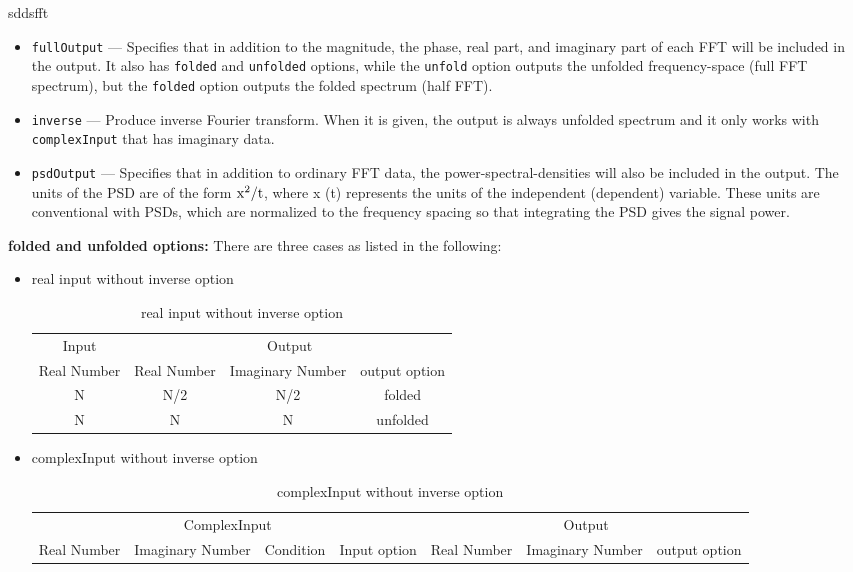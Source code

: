 \begin{sddsprog}{sddsfft}
\begin{itemize}
      \item \verb|fullOutput| --- Specifies that in addition to the magnitude, the phase, real part, and imaginary part of each FFT will be included in the output. It also has \verb|folded| and \verb|unfolded| options, while the \verb|unfold| option outputs the unfolded frequency-space (full FFT spectrum), but the \verb|folded| option outputs the folded spectrum (half FFT).
      \item \verb|inverse| --- Produce inverse Fourier transform. When it is given, the output is always unfolded spectrum and it only works with \verb|complexInput| that has imaginary data.
      \item \verb|psdOutput| --- Specifies that in addition to ordinary FFT data, the power-spectral-densities will also be included in the output. The units of the PSD are of the form ${\rm x^2/t}$, where x (t) represents the units of the independent (dependent) variable. These units are conventional with PSDs, which are normalized to the frequency spacing so that integrating the PSD gives the signal power.
    \end{itemize}
  \item \textbf{folded and unfolded options:} There are three cases as listed in the following:
    \begin{itemize}
      \item real input without inverse option
        \begin{table}[hbt]
          \caption{real input without inverse option}
          \begin{tabular}{|c|c|c|c|}
            Input & \multicolumn{3}{|c|}{Output} \\
            Real Number & Real Number & Imaginary Number & output option \\ \hline
            N & N/2 & N/2 & folded \\ \hline
            N & N & N & unfolded \\ \hline
          \end{tabular}
          \label{table1}
        \end{table}
      \item complexInput without inverse option
        \begin{table}[hbt]
          \caption{complexInput without inverse option}
          \begin{tabular}{|c|c|c|c|c|c|c|}
            \multicolumn{4}{|c|}{ComplexInput} & \multicolumn{3}{|c|}{Output} \\
            Real Number & Imaginary Number & Condition & Input option & Real Number & Imaginary Number & output option \\ \hline

\end{tabular}
\end{table}
\end{itemize}
\end{sddsprog}
